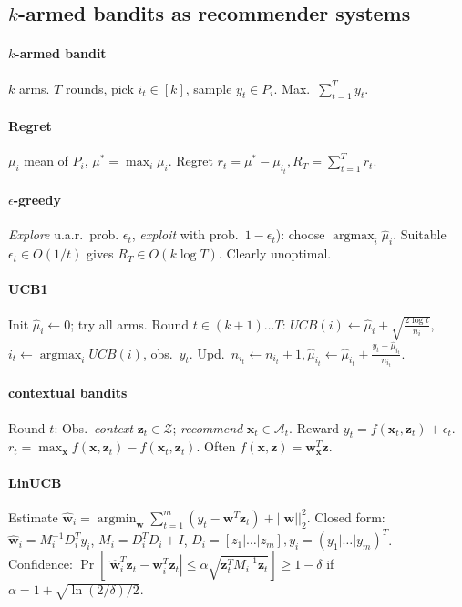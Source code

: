 \documentclass[9pt]{scrartcl}
\DeclareMathOperator{\argmin}{argmin}
\DeclareMathOperator{\argmax}{argmax}
\newcommand{\eps}{\epsilon}
\begin{document}
\begin{twocolumn}
\section{$k$-armed bandits as recommender systems}
\paragraph{$k$-armed bandit}
$k$ arms. $T$ rounds, pick $i_t\in[k]$, sample $y_t \in P_i$. Max.\ $\sum_{t=1}^{T} y_t$.
\paragraph{Regret} $\mu_i$ mean of $P_i$, $\mu^* = \max_i \mu_i$. Regret $r_t = \mu^* - \mu_{i_t}, R_T = \sum_{t=1}^{T} r_t$.
\paragraph{$\eps$-greedy} \emph{Explore} u.a.r.\ prob. $\eps_t$, \emph{exploit} with prob.\ $1-\eps_t$): choose $\argmax_i\hat\mu_i$.
Suitable $\eps_t \in O(1/t)$ gives $R_T \in O(k\log T)$. Clearly unoptimal.
\paragraph{UCB1}
Init $\hat\mu_i \leftarrow 0$; try all arms.
Round $t\in (k+1) \dots T$: $UCB(i) \leftarrow \hat\mu_i+\sqrt{\frac{2\log t}{n_i}}$, $i_t \leftarrow \argmax_i UCB(i)$, obs.\ $y_t$. Upd.\ $n_{i_t} \leftarrow n_{i_t}+1, \hat\mu_{i_t}\leftarrow\hat\mu_{i_t}+\frac{y_t-\hat\mu_{i_t}}{n_{i_t}}$.
\paragraph{contextual bandits} Round $t$: Obs.\ \emph{context} $\bm z_t \in\mathcal Z$; \emph{recommend} $\bm x_t \in \mathcal A_t$. Reward $y_t = f(\bm x_t,\bm z_t) + \eps_t$. $r_t = \max_{\bm x}f(\bm x, \bm z_t) - f(\bm x_t,\bm z_t)$. Often $f(\bm x,\bm z) = \bm w_{\bm x}^T\bm z$.

\paragraph{LinUCB}
Estimate $\hat{\bm w}_{i} = \argmin_{\bm w}\sum_{t=1}^{m}(y_t-\bm w^T\bm z_t) + ||\bm w||_2^2$.
Closed form: $\hat{\bm w}_{i} = M_{i}^{-1}D_{i}^Ty_{i}$,
$M_{i} = D_{i}^TD_{i} + I$,
$D_{i} = [z_1|\dots|z_m], y_{i} = (y_1|\dots|y_m)^T$.\\
Confidence: $\Pr\left [|\hat{\bm w}_{i}^T\bm z_t - \bm w_{i}^T\bm z_t| \leq \alpha\sqrt{\bm z_t^T M_{i}^{-1}\bm z_t}\right ] \geq 1-\delta$ if $\alpha = 1 + \sqrt{\ln(2/\delta)/2}$.


\end{twocolumn}
\end{document}
